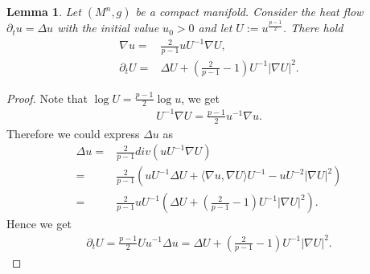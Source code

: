 \documentclass[11pt]{amsart}
\newtheorem{lemma}{Lemma}
\numberwithin{equation}{section}
\numberwithin{lemma}{section}
\numberwithin{proposition}{section}
\numberwithin{corollary}{section}
\numberwithin{remark}{section}
\begin{document}
\begin{lemma}\label{lem. evolution of U}
Let $(M^n,g)$ be a compact manifold.
    Consider the heat flow $\partial_t u=\Delta u$ with the initial value $u_0>0$ and let $U:=u^{\frac{p-1}{2}}$. There hold
    \begin{align*}
    \nabla u=&\frac{2}{p-1}uU^{-1}\nabla U,\\
        \partial_t U
        =&\Delta U
        +\left(\frac{2}{p-1}-1\right)U^{-1}|\nabla U|^2.
    \end{align*}
\end{lemma}
\begin{proof}
Note that $\log U=\frac{p-1}{2}\log u$, we get
    \begin{align*}
        U^{-1}\nabla U=\frac{p-1}{2}u^{-1}\nabla u.
    \end{align*}
    Therefore we could express $\Delta u$ as
    \begin{align*}
        \Delta u
        =&\frac{2}{p-1}div(uU^{-1}\nabla U)\\
        =&\frac{2}{p-1}
        (uU^{-1}\Delta U
        +\langle\nabla u,\nabla U\rangle U^{-1}
        -uU^{-2}|\nabla U|^2
        )\\
        =&\frac{2}{p-1}uU^{-1}
        \left(
        \Delta U
        +\left(\frac{2}{p-1}-1\right)U^{-1}|\nabla U|^2
        \right).
    \end{align*}
    Hence we get 
    \begin{align*}
        \partial_t U
        =\frac{p-1}{2}Uu^{-1}\Delta u
        =\Delta U
        +\left(\frac{2}{p-1}-1\right)U^{-1}|\nabla U|^2.
    \end{align*}
\end{proof}
\end{document}
